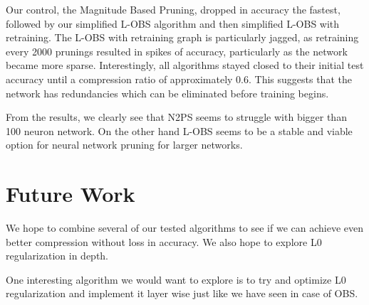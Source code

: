 \documentclass{article}
\begin{document}
Our control, the Magnitude Based Pruning, dropped in accuracy the fastest, followed by our simplified L-OBS algorithm and then simplified L-OBS with retraining. The L-OBS with retraining graph is particularly jagged, as retraining every 2000 prunings resulted in spikes of accuracy, particularly as the network became more sparse. Interestingly, all algorithms stayed closed to their initial test accuracy until a compression ratio of approximately 0.6. This suggests that the network has redundancies which can be eliminated before training begins.

From the results, we clearly see that N2PS seems to struggle with bigger than 100 neuron network. On the other hand L-OBS seems to be a stable and viable option for neural network pruning for larger networks. 

\section{Future Work}
\label{Future Work}

We hope to combine several of our tested algorithms to see if we can achieve even better compression without loss in accuracy. We also hope to explore L0 regularization in depth. 

One interesting algorithm we would want to explore is to try and optimize L0 regularization and implement it layer wise just like we have seen in case of OBS.


\newpage



\end{document}
